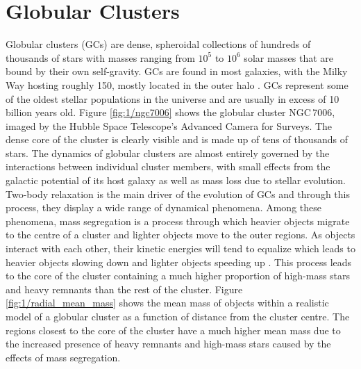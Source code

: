 

\section{Globular Clusters}


Globular clusters (GCs) are dense, spheroidal collections of hundreds of thousands of stars with
masses ranging from $10^5$ to $10^6$ solar masses that are bound by their own self-gravity. GCs are
found in most galaxies, with the Milky Way hosting roughly 150, mostly located in the outer halo
\citep[e.g.][]{Heggie2003}. GCs represent some of the oldest stellar populations in the universe and
are usually in excess of 10 billion years old. Figure \ref{fig:1/ngc7006} shows the globular cluster
NGC\,7006, imaged by the Hubble Space Telescope's Advanced Camera for Surveys. The dense core of the
cluster is clearly visible and is made up of tens of thousands of stars. The dynamics of globular
clusters are almost entirely governed by the interactions between individual cluster members, with
small effects from the galactic potential of its host galaxy as well as mass loss due to stellar
evolution. Two-body relaxation is the main driver of the evolution of GCs and through this process,
they display a wide range of dynamical phenomena. Among these phenomena, mass segregation is a
process through which heavier objects migrate to the centre of a cluster and lighter objects move to
the outer regions. As objects interact with each other, their kinetic energies will tend to equalize
which leads to heavier objects slowing down and lighter objects speeding up
\citep[e.g.][]{Heggie2003}. This process leads to the core of the cluster containing a much higher
proportion of high-mass stars and heavy remnants than the rest of the cluster. Figure
\ref{fig:1/radial_mean_mass} shows the mean mass of objects within a realistic model of a globular
cluster as a function of distance from the cluster centre. The regions closest to the core of the
cluster have a much higher mean mass due to the increased presence of heavy remnants and high-mass
stars caused by the effects of mass segregation.

